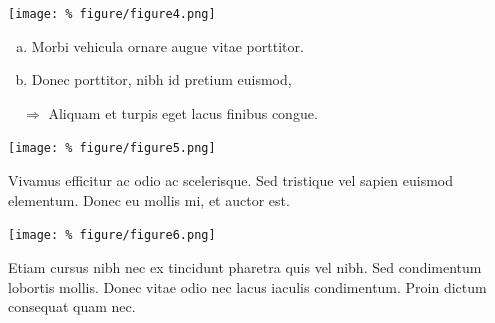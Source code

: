 \documentclass[unknownkeysallowed,usepdftitle=false, parskip=full]{beamer}
\newcommand{\secvariable}{nothing}
\newcommand{\mysection}[1]{\renewcommand{\secvariable}{#1}
}
\begin{document}
\mysection{line}
\begin{frame}\label{\secvariable}
\begin{center}
  \vspace{-0.5cm}
 \texttt{[image: \%
  figure/figure4.png]}
\end{center}
  \vspace{-0.5cm}
  \begin{enumerate}[(a)]
  
  
  \item Morbi vehicula ornare augue vitae porttitor.
  \item Donec porttitor, nibh id pretium euismod,
  \end{enumerate}

  $\quad \Rightarrow$ Aliquam et turpis eget lacus finibus congue.
  
\end{frame}

\mysection{major}
\begin{frame}\label{\secvariable} %
\begin{center}
\texttt{[image: \%
figure/figure5.png]}
\end{center}

    \parbox{\linewidth}{

Vivamus efficitur ac odio ac scelerisque. Sed tristique vel sapien euismod elementum. Donec eu mollis mi, et auctor est.
}
\end{frame}

\mysection{slab}
\begin{frame}\label{\secvariable}
\begin{center}
\texttt{[image: \%
figure/figure6.png]}
\end{center}
    \parbox{\linewidth}{

Etiam cursus nibh nec ex tincidunt pharetra quis vel nibh. Sed condimentum lobortis mollis. Donec vitae odio nec lacus iaculis condimentum. Proin dictum consequat quam nec. \hyperlink{slabtable}{}
}

\end{frame}
\end{document}
